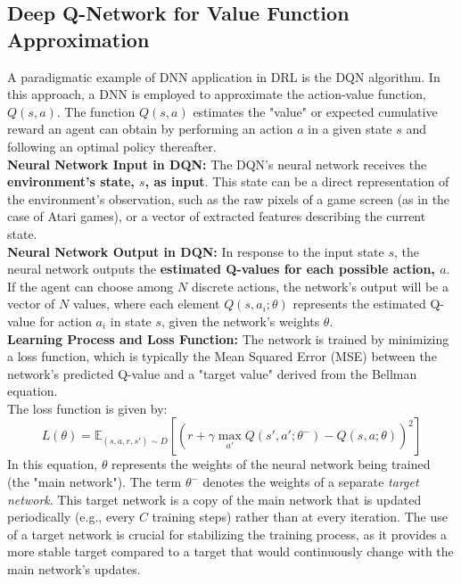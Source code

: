 \subsection{Deep Q-Network for Value Function Approximation}
\noindent
A paradigmatic example of DNN application in DRL is the DQN algorithm. In this approach, a DNN is employed to approximate the action-value function, $Q(s, a)$. The function $Q(s, a)$ estimates the "value" or expected cumulative reward an agent can obtain by performing an action $a$ in a given state $s$ and following an optimal policy thereafter.
\\ \noindent
\textbf{Neural Network Input in DQN:} The DQN's neural network receives the \textbf{environment's state, $s$, as input}. This state can be a direct representation of the environment's observation, such as the raw pixels of a game screen (as in the case of Atari games), or a vector of extracted features describing the current state.
\\ \noindent
\textbf{Neural Network Output in DQN:} In response to the input state $s$, the neural network outputs the \textbf{estimated Q-values for each possible action, $a$}. If the agent can choose among $N$ discrete actions, the network's output will be a vector of $N$ values, where each element $Q(s, a_i; \theta)$ represents the estimated Q-value for action $a_i$ in state $s$, given the network's weights $\theta$.
\\ \noindent
\textbf{Learning Process and Loss Function:} The network is trained by minimizing a loss function, which is typically the Mean Squared Error (MSE) between the network's predicted Q-value and a "target value" derived from the Bellman equation. 
\\ 
\noindent
The loss function is given by:
\begin{equation}
 L(\theta) = \mathbb{E}_{(s, a, r, s') \sim D} \left[ \left( r + \gamma \max_{a'} Q(s', a'; \theta^{-}) - Q(s, a; \theta) \right)^2 \right]
\end{equation}
\noindent
In this equation, $\theta$ represents the weights of the neural network being trained (the "main network"). The term $\theta^{-}$ denotes the weights of a separate \textit{target network}. This target network is a copy of the main network that is updated periodically (e.g., every $C$ training steps) rather than at every iteration. The use of a target network is crucial for stabilizing the training process, as it provides a more stable target compared to a target that would continuously change with the main network's updates.
